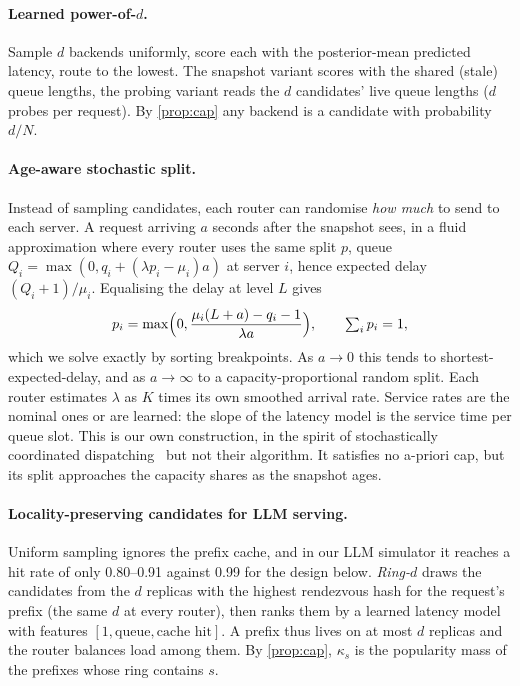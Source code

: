 \documentclass[10pt,twocolumn,letterpaper]{article}
\begin{document}
\paragraph{Learned power-of-$d$.} Sample $d$ backends uniformly, score each with
the posterior-mean predicted latency, route to the lowest. The snapshot variant
scores with the shared (stale) queue lengths, the probing variant reads the $d$
candidates' live queue lengths ($d$ probes per request). By \cref{prop:cap}
any backend is a candidate with probability $d/N$.

\paragraph{Age-aware stochastic split.} Instead of sampling candidates, each
router can randomise \emph{how much} to send to each server. A request arriving
$a$ seconds after the snapshot sees, in a fluid approximation where every router
uses the same split $p$, queue $Q_i=\max(0,q_i+(\lambda p_i-\mu_i)a)$ at server $i$,
hence expected delay $(Q_i+1)/\mu_i$. Equalising the delay at level $L$ gives
\[
p_i=\max\Bigl(0,\frac{\mu_i(L+a)-q_i-1}{\lambda a}\Bigr),\qquad \textstyle\sum_i p_i=1,
\]
which we solve exactly by sorting breakpoints. As $a\to0$ this tends to
shortest-expected-delay, and as $a\to\infty$ to a capacity-proportional random
split. Each router estimates $\lambda$ as $K$ times its own smoothed arrival
rate. Service rates are the nominal ones or are learned: the slope of the
latency model is the service time per queue slot. This is our own construction,
in the spirit of stochastically coordinated dispatching~\citep{goren2021stochastic}
but not their algorithm. It satisfies no a-priori cap, but its split
approaches the capacity shares as the snapshot ages.

\paragraph{Locality-preserving candidates for LLM serving.} Uniform sampling
ignores the prefix cache, and in our LLM simulator it reaches a hit rate of only
0.80--0.91 against 0.99 for the design below. \emph{Ring-$d$}
draws the candidates from the $d$ replicas with the highest rendezvous hash for
the request's prefix (the same $d$ at every router), then ranks them by a learned
latency model with features $[1,\text{queue},\text{cache hit}]$. A prefix thus
lives on at most $d$ replicas and the router balances load among them.
By \cref{prop:cap}, $\kappa_s$ is the popularity mass of the prefixes whose ring
contains $s$.
\end{document}
